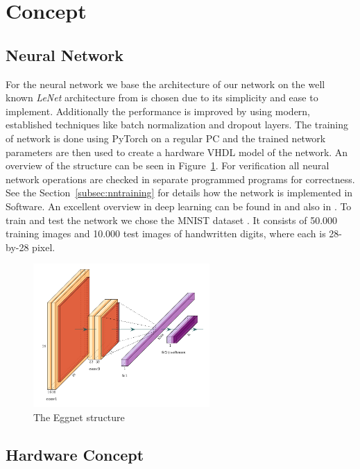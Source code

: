 \section{Concept}

\subsection{Neural Network}

For the neural network we base the architecture of our network on the well known \emph{LeNet} architecture from \cite{LeCun:1998aa} is chosen due to its simplicity and ease to implement. Additionally the performance is improved by using modern, established techniques like batch normalization \cite{Ioffe:2015aa} and dropout \cite{Srivastava:2014aa} layers. 
The training of network is done using PyTorch \cite{Paszke:2019aa} on a regular PC and the trained network parameters are then used to create a hardware VHDL model of the network. An overview of the structure can be seen in Figure~\ref{fig:eggnet}. For verification all neural network operations are checked in separate programmed programs for correctness. See the Section~\ref{subsec:nntraining} for details how the network is implemented in Software.
An excellent overview in deep learning can be found in \cite{Schmidhuber:2015aa} and also in \cite{Goodfellow:2016aa}.
To train and test the network we chose the MNIST dataset \cite{LeCun:1998ab}. It consists of 50.000 training images and 10.000 test images of handwritten digits, where each is 28-by-28 pixel.

\begin{figure}[hbt]
	\centering
	\includegraphics[width=0.6\textwidth]{img/eggnet}
	\caption{The Eggnet structure}
	\label{fig:eggnet}
\end{figure}


\subsection{Hardware Concept}

